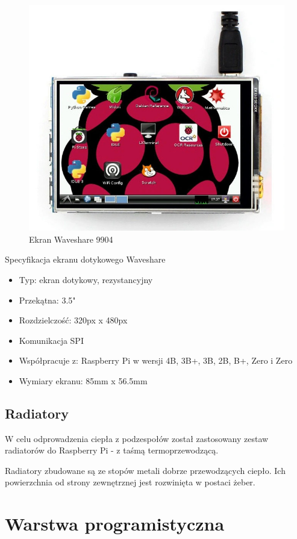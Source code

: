 \documentclass[a4paper,12pt,reqno]{article}
\begin{document}
\begin{figure}[H]%
\centering
\includegraphics[width=0.8\columnwidth]{imgs/ekran.jpg}
\caption{Ekran Waveshare 9904 \cite{img_screen} \label{ekran}}
\quad
\end{figure}

Specyfikacja ekranu dotykowego Waveshare

\begin{itemize}
	\item Typ: ekran dotykowy, rezystancyjny
	\item Przekątna: 3.5"
	\item Rozdzielczość: 320px x 480px
	\item Komunikacja SPI
	\item Współpracuje z: Raspberry Pi w wersji 4B, 3B+, 3B, 2B, B+, Zero i Zero
	\item Wymiary ekranu: 85mm x 56.5mm
\end{itemize}

\subsection{Radiatory}

W celu odprowadzenia ciepła z podzespołów został zastosowany zestaw radiatorów do Raspberry Pi - z taśmą termoprzewodzącą.

Radiatory zbudowane są ze stopów metali dobrze przewodzących ciepło. Ich powierzchnia od strony zewnętrznej jest rozwinięta w postaci żeber.

\newpage
\section{Warstwa programistyczna} \label{section:warstwa_programistyczna}
\end{document}
